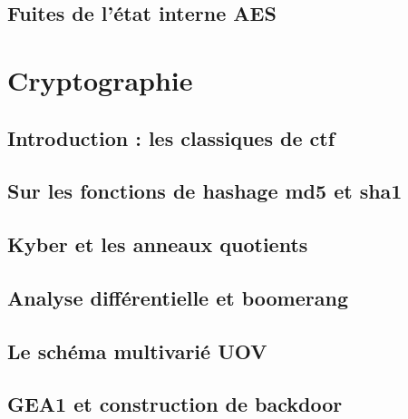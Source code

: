 \documentclass[aspectratio=169,xcolor=dvipsnames]{beamer}
\begin{document}
\subsection{Fuites de l'état interne AES}



\section{Cryptographie}
\subsection{Introduction : les classiques de ctf}

\subsection{Sur les fonctions de hashage md5 et sha1}

\subsection{Kyber et les anneaux quotients}

\subsection{Analyse différentielle et boomerang}

\subsection{Le schéma multivarié UOV}

\subsection{GEA1 et construction de backdoor}

\end{document}
